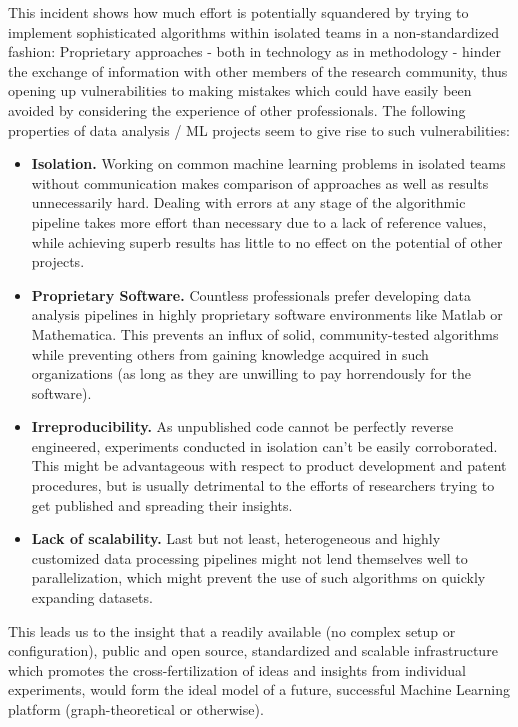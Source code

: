 \par

This incident shows how much effort is potentially squandered by trying to implement sophisticated algorithms within isolated teams in a non-standardized fashion: Proprietary approaches - both in technology as in methodology - hinder the exchange of information with other members of the research community, thus opening up vulnerabilities to making mistakes which could have easily been avoided by considering the experience of other professionals. The following properties of data analysis / ML projects seem to give rise to such vulnerabilities:

\begin{itemize}
	\item \textbf{Isolation.} Working on common machine learning problems in isolated teams without communication makes comparison of approaches as well as results unnecessarily hard. Dealing with errors at any stage of the algorithmic pipeline takes more effort than necessary due to a lack of reference values, while achieving superb results has little to no effect on the potential of other projects.
	\item \textbf{Proprietary Software.} Countless professionals prefer developing data analysis pipelines in highly proprietary software environments like Matlab or Mathematica. This prevents an influx of solid, community-tested algorithms while preventing others from gaining knowledge acquired in such organizations (as long as they are unwilling to pay horrendously for the software).
	\item \textbf{Irreproducibility.} As unpublished code cannot be perfectly reverse engineered, experiments conducted in isolation can't be easily corroborated. This might be advantageous with respect to product development and patent procedures, but is usually detrimental to the efforts of researchers trying to get published and spreading their insights.
	\item \textbf{Lack of scalability.} Last but not least, heterogeneous and highly customized data processing pipelines might not lend themselves well to parallelization, which might prevent the use of such algorithms on quickly expanding datasets.
\end{itemize}

This leads us to the insight that a readily available (no complex setup or configuration), public and open source, standardized and scalable infrastructure which promotes the cross-fertilization of ideas and insights from individual experiments, would form the ideal model of a future, successful Machine Learning platform (graph-theoretical or otherwise).


